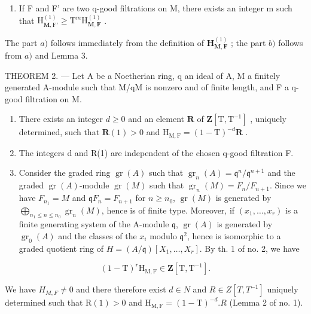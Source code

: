 \begin{enumerate}
\def\labelenumi{\alph{enumi})}
\setcounter{enumi}{1}
\tightlist
\item
  If F and F' are two q-good filtrations on M, there exists an integer m such that \(\mathrm{H}_{\mathbf{M},\mathrm{F}'}^{(1)} \geqslant \mathrm{T}^{m}\mathrm{H}_{\mathbf{M},\mathbf{F}}^{(1)}\) .
\end{enumerate}

The part \(a)\) follows immediately from the definition of \(\mathbf{H}_{\mathbf{M},\mathbf{F}}^{(1)}\) ; the part \(b)\) follows from \(a)\) and Lemma 3.

THEOREM 2. --- Let A be a Noetherian ring, q an ideal of A, M a finitely generated A-module such that M/qM is nonzero and of finite length, and F a q-good filtration on M.

\begin{enumerate}
\def\labelenumi{\alph{enumi})}
\item
  There exists an integer \(d \geqslant 0\) and an element \(\mathbf{R}\) of \(\mathbf{Z}[\mathrm{T}, \mathrm{T}^{-1}]\) , uniquely determined, such that \(\mathbf{R}(1) > 0\) and \(\mathrm{H}_{\mathrm{M,F}} = (1 - \mathrm{T})^{-d}\mathbf{R}\) .
\item
  The integers d and R(1) are independent of the chosen q-good filtration F.
\item
  Consider the graded ring \(\operatorname{gr}(A)\) such that \(\operatorname{gr}_{n}(A) = \mathfrak{q}^{n}/\mathfrak{q}^{n+1}\) and the graded \(\operatorname{gr}(A)\)-module \(\operatorname{gr}(M)\) such that \(\operatorname{gr}_{n}(M) = F_{n}/F_{n+1}\). Since we have \(F_{n_{1}} = M\) and \(\mathfrak{q}F_{n} = F_{n+1}\) for \(n \geqslant n_{0}\), \(\operatorname{gr}(M)\) is generated by \(\bigoplus_{n_{1} \leqslant n \leqslant n_{0}} \operatorname{gr}_{n}(M)\), hence is of finite type. Moreover, if \((x_{1},\ldots,x_{r})\) is a finite generating system of the A-module \(\mathfrak{q}\), \(\operatorname{gr}(A)\) is generated by \(\operatorname{gr}_{0}(A)\) and the classes of the \(x_{i}\) modulo \(\mathfrak{q}^{2}\), hence is isomorphic to a graded quotient ring of \(H = (A/\mathfrak{q})[X_{1},\ldots,X_{r}]\). By th. 1 of no. 2, we have
\end{enumerate}

\[
(1 - \mathrm{T}) ^ {r} \mathrm{H} _ {\mathrm{M}, \mathrm{F}} \in \mathbf {Z} [ \mathrm{T}, \mathrm{T} ^ {- 1} ].
\]

We have \(H_{M,F} \neq 0\) and there therefore exist \(d \in N\) and \(R \in Z[T, T^{-1}]\) uniquely determined such that \(\mathrm{R}(1) > 0\) and \(\mathrm{H}_{\mathrm{M},\mathrm{F}} = (1 - \mathrm{T})^{-d}. R\) (Lemma 2 of no. 1).

